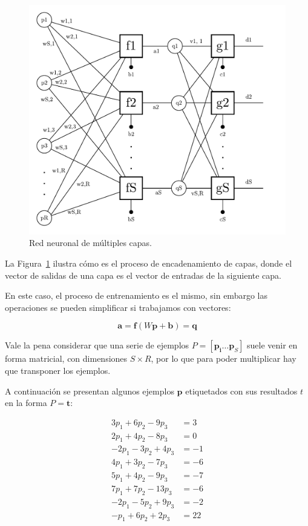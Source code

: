 \documentclass{article}
\begin{document}
\begin{figure}[htbp]
    \centering
    \includegraphics[width=\textwidth]{multi-layer-NN.pdf}
    \caption{Red neuronal de múltiples capas.}
    \label{fig:mlp}
\end{figure}

La Figura~\ref{fig:mlp} ilustra cómo es el proceso de encadenamiento de capas, donde el vector de salidas de una capa es el vector de entradas de la siguiente capa.

En este caso, el proceso de entrenamiento es el mismo, sin embargo las operaciones se pueden simplificar si trabajamos con vectores:

\begin{equation}
    \mathbf{a} = \mathbf{f}\left( W\mathbf{p} + \mathbf{b} \right) = \mathbf{q}
\end{equation}

Vale la pena considerar que una serie de ejemplos $P = \left[ \mathbf{p_i} \dots \mathbf{p}_S \right]$ suele venir en forma matricial, con dimensiones $S \times R$, por lo que para poder multiplicar hay que transponer los ejemplos.

A continuación se presentan algunos ejemplos $\mathbf{p}$ etiquetados con sus resultados $t$ en la forma $P = \mathbf{t}$:

\begin{align}
    3p_1 + 6p_2 - 9p_3 & = 3 \\
    2p_1 + 4p_2 - 8p_3 & = 0 \\
   -2p_1 - 3p_2 + 4p_3 & = -1 \\
    4p_1 + 3p_2 - 7p_3 & = -6 \\
    5p_1 + 4p_2 - 9p_3 & = -7 \\
    7p_1 + 7p_2 - 13p_3 & = -6 \\
   -2p_1 - 5p_2 + 9p_3 & = -2 \\
    -p_1 + 6p_2 + 2p_3 & = 22
\end{align}
\end{document}
